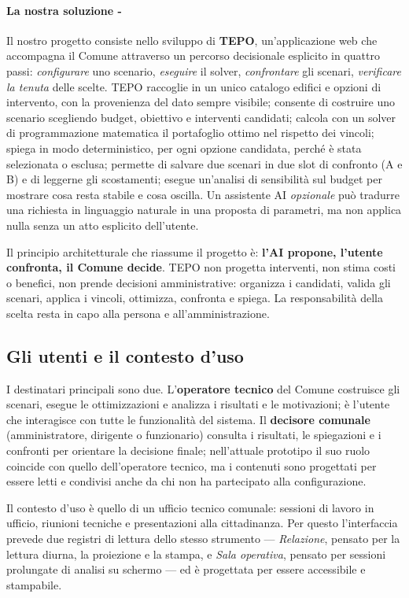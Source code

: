 \paragraph*{La nostra soluzione -}
Il nostro progetto consiste nello sviluppo di \textbf{TEPO}, un'applicazione web che accompagna il Comune attraverso un percorso decisionale esplicito in quattro passi: \emph{configurare} uno scenario, \emph{eseguire} il solver, \emph{confrontare} gli scenari, \emph{verificare la tenuta} delle scelte. TEPO raccoglie in un unico catalogo edifici e opzioni di intervento, con la provenienza del dato sempre visibile; consente di costruire uno scenario scegliendo budget, obiettivo e interventi candidati; calcola con un solver di programmazione matematica il portafoglio ottimo nel rispetto dei vincoli; spiega in modo deterministico, per ogni opzione candidata, perché è stata selezionata o esclusa; permette di salvare due scenari in due slot di confronto (A e B) e di leggerne gli scostamenti; esegue un'analisi di sensibilità sul budget per mostrare cosa resta stabile e cosa oscilla. Un assistente AI \emph{opzionale} può tradurre una richiesta in linguaggio naturale in una proposta di parametri, ma non applica nulla senza un atto esplicito dell'utente.

Il principio architetturale che riassume il progetto è: \textbf{l'AI propone, l'utente confronta, il Comune decide}. TEPO non progetta interventi, non stima costi o benefici, non prende decisioni amministrative: organizza i candidati, valida gli scenari, applica i vincoli, ottimizza, confronta e spiega. La responsabilità della scelta resta in capo alla persona e all'amministrazione.

\subsection*{Gli utenti e il contesto d'uso}
I destinatari principali sono due. L'\textbf{operatore tecnico} del Comune costruisce gli scenari, esegue le ottimizzazioni e analizza i risultati e le motivazioni; è l'utente che interagisce con tutte le funzionalità del sistema. Il \textbf{decisore comunale} (amministratore, dirigente o funzionario) consulta i risultati, le spiegazioni e i confronti per orientare la decisione finale; nell'attuale prototipo il suo ruolo coincide con quello dell'operatore tecnico, ma i contenuti sono progettati per essere letti e condivisi anche da chi non ha partecipato alla configurazione.

Il contesto d'uso è quello di un ufficio tecnico comunale: sessioni di lavoro in ufficio, riunioni tecniche e presentazioni alla cittadinanza. Per questo l'interfaccia prevede due registri di lettura dello stesso strumento --- \emph{Relazione}, pensato per la lettura diurna, la proiezione e la stampa, e \emph{Sala operativa}, pensato per sessioni prolungate di analisi su schermo --- ed è progettata per essere accessibile e stampabile.

